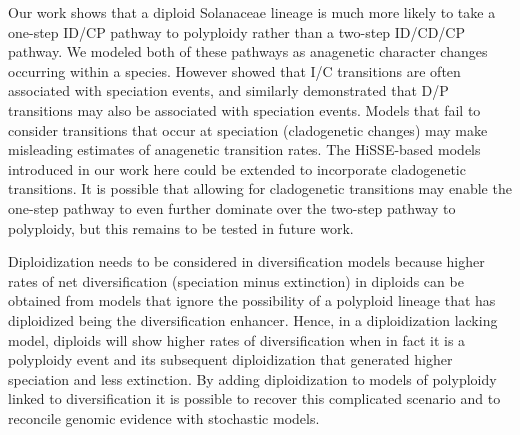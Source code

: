 %
%
%
Our work shows that a diploid Solanaceae lineage is much more likely to take a
one-step ID/CP pathway to polyploidy rather than a two-step ID/CD/CP pathway. 
We modeled both of these pathways as anagenetic character changes occurring within a species.
However \citet{goldberg_2012} showed that I/C transitions are often associated with speciation events, and similarly \citet{freyman_2017} demonstrated that D/P transitions may also be associated with speciation events. 
Models that fail to consider transitions that occur at speciation (cladogenetic changes) may
make misleading estimates of anagenetic transition rates.
The HiSSE-based models introduced in our work here could be extended to incorporate cladogenetic transitions. 
It is possible that allowing for cladogenetic transitions may enable the one-step pathway
to even further dominate over the two-step pathway to polyploidy, but this remains to be tested in future work.


Diploidization needs to be considered in diversification models because higher rates of net diversification (speciation minus extinction) in diploids can be obtained from models that ignore the possibility of a polyploid lineage that has diploidized being the diversification enhancer. Hence, in a diploidization lacking model, diploids will show higher rates of diversification when in fact it is a polyploidy event and its subsequent diploidization that generated higher speciation and less extinction.  By adding diploidization to models of polyploidy linked to diversification it is possible to recover this complicated scenario and to reconcile genomic evidence with stochastic models. 

